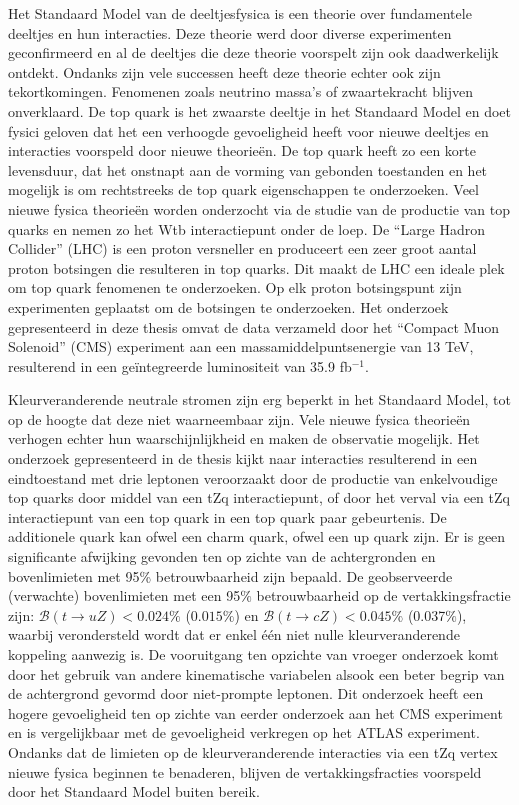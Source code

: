 \chapterprecishere{\Titledutch}
Het Standaard Model van de deeltjesfysica is een theorie over fundamentele deeltjes en hun interacties. Deze theorie werd door diverse experimenten geconfirmeerd en al de deeltjes die deze theorie voorspelt zijn ook daadwerkelijk ontdekt. Ondanks zijn vele successen heeft deze theorie echter ook zijn tekortkomingen. Fenomenen zoals neutrino massa's of zwaartekracht blijven onverklaard. De top quark is het zwaarste deeltje in het Standaard Model en doet fysici geloven dat het een verhoogde gevoeligheid heeft voor nieuwe deeltjes en interacties voorspeld door nieuwe theorie\"en. De top quark heeft zo een korte levensduur, dat het onstnapt aan de vorming van gebonden toestanden en het mogelijk is om rechtstreeks de top quark eigenschappen te onderzoeken. 
Veel nieuwe fysica theorie\"en worden onderzocht  via de studie van de productie van top quarks en nemen zo het Wtb interactiepunt onder de loep. De  ``Large Hadron Collider'' (LHC) is een proton versneller en produceert een zeer groot aantal proton botsingen die resulteren in top quarks.  Dit maakt de LHC een ideale plek om top quark fenomenen te onderzoeken. Op elk proton 
botsingspunt zijn experimenten geplaatst om de botsingen te onderzoeken.  Het onderzoek gepresenteerd in deze thesis omvat de data verzameld door het ``Compact Muon Solenoid'' (CMS) experiment aan een massamiddelpuntsenergie van  13 TeV, resulterend in een ge\"integreerde luminositeit van 35.9 fb$^{-1}$. 


Kleurveranderende neutrale stromen zijn erg beperkt in het Standaard Model, tot op de hoogte dat deze niet waarneembaar zijn. Vele nieuwe fysica theorie\"en verhogen echter hun waarschijnlijkheid en maken de observatie mogelijk. Het onderzoek gepresenteerd in de thesis kijkt naar interacties resulterend in een eindtoestand met drie leptonen veroorzaakt door de productie van enkelvoudige top quarks door middel van een tZq interactiepunt, of door het verval via een tZq interactiepunt van een top quark in een top quark paar gebeurtenis. De additionele quark kan ofwel een charm quark, ofwel een up quark zijn. Er is geen significante afwijking gevonden ten op zichte van de achtergronden en bovenlimieten met 95\% betrouwbaarheid zijn bepaald. De geobserveerde (verwachte) bovenlimieten met een 95$\%$ betrouwbaarheid op de vertakkingsfractie zijn: ${\mathcal{B}}(t \rightarrow uZ) < 0.024\%$ ($0.015\%$) en ${\mathcal{B}}(t \rightarrow cZ) < 0.045\%$ (0.037$\%$), waarbij verondersteld wordt dat er enkel \'e\'en niet nulle kleurveranderende koppeling aanwezig is. \newpage
\thispagestyle{empty}
De vooruitgang ten opzichte van vroeger onderzoek komt door het gebruik van andere kinematische variabelen alsook  een beter begrip van de achtergrond gevormd door niet-prompte leptonen.  Dit onderzoek heeft een  hogere gevoeligheid ten op zichte van eerder onderzoek aan het CMS experiment en is vergelijkbaar met de gevoeligheid verkregen op het ATLAS experiment. Ondanks dat 
de limieten op de kleurveranderende interacties via een tZq vertex nieuwe fysica beginnen te benaderen, blijven de vertakkingsfracties voorspeld door het Standaard Model buiten bereik. 